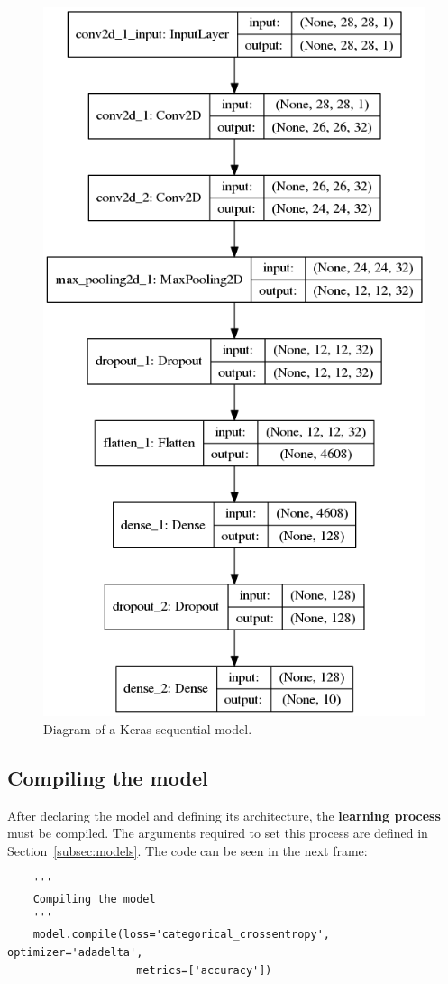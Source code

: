 \begin{figure}
	\centering
	\includegraphics[width=0.75\linewidth, keepaspectratio]{figures/model.png}
	\caption{Diagram of a Keras sequential model.}
	\label{fig:model}
\end{figure}

\subsection{Compiling the model}
After declaring the model and defining its architecture, the \textbf{learning process} must be compiled. The arguments required to set this process are defined in Section~\ref{subsec:models}. The code can be seen in the next frame:
\begin{lstlisting}
    '''
    Compiling the model
    '''
    model.compile(loss='categorical_crossentropy', optimizer='adadelta', 
				    metrics=['accuracy'])
\end{lstlisting}

